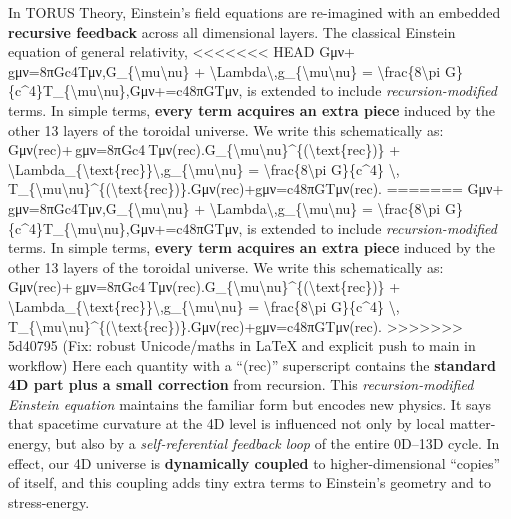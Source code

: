 \documentclass[]{article}
\begin{document}
In TORUS Theory, Einstein's field equations are re-imagined with an
embedded \textbf{recursive feedback} across all dimensional layers. The
classical Einstein equation of general relativity,
<<<<<<< HEAD
Gμν+\Lambda gμν=8πGc4Tμν,G\_\{\textbackslash mu\textbackslash nu\} +
\textbackslash Lambda\textbackslash,g\_\{\textbackslash mu\textbackslash nu\}
= \textbackslash frac\{8\textbackslash pi
G\}\{c\^{}4\}T\_\{\textbackslash mu\textbackslash nu\},Gμν\hspace{0pt}+\hspace{0pt}=c48πG\hspace{0pt}Tμν\hspace{0pt},
is extended to include \emph{recursion-modified} terms. In simple terms,
\textbf{every term acquires an extra piece} induced by the other 13
layers of the toroidal universe. We write this schematically as:
Gμν(rec)+\Lambdarec gμν=8πGc4 Tμν(rec).G\_\{\textbackslash mu\textbackslash nu\}\^{}\{(\textbackslash text\{rec\})\}
+
\textbackslash Lambda\_\{\textbackslash text\{rec\}\}\textbackslash,g\_\{\textbackslash mu\textbackslash nu\}
= \textbackslash frac\{8\textbackslash pi G\}\{c\^{}4\} \textbackslash,
T\_\{\textbackslash mu\textbackslash nu\}\^{}\{(\textbackslash text\{rec\})\}.Gμν(rec)\hspace{0pt}+\Lambdarec\hspace{0pt}gμν\hspace{0pt}=c48πG\hspace{0pt}Tμν(rec)\hspace{0pt}.
=======
Gμν+\Lambda gμν=8πGc4Tμν,G\_\{\textbackslash{}mu\textbackslash{}nu\} +
\textbackslash{}Lambda\textbackslash{},g\_\{\textbackslash{}mu\textbackslash{}nu\}
= \textbackslash{}frac\{8\textbackslash{}pi
G\}\{c\^{}4\}T\_\{\textbackslash{}mu\textbackslash{}nu\},Gμν​+​=c48πG​Tμν​,
is extended to include \emph{recursion-modified} terms. In simple terms,
\textbf{every term acquires an extra piece} induced by the other 13
layers of the toroidal universe. We write this schematically as:
Gμν(rec)+\Lambdarec gμν=8πGc4 Tμν(rec).G\_\{\textbackslash{}mu\textbackslash{}nu\}\^{}\{(\textbackslash{}text\{rec\})\}
+
\textbackslash{}Lambda\_\{\textbackslash{}text\{rec\}\}\textbackslash{},g\_\{\textbackslash{}mu\textbackslash{}nu\}
= \textbackslash{}frac\{8\textbackslash{}pi G\}\{c\^{}4\}
\textbackslash{},
T\_\{\textbackslash{}mu\textbackslash{}nu\}\^{}\{(\textbackslash{}text\{rec\})\}.Gμν(rec)​+\Lambdarec​gμν​=c48πG​Tμν(rec)​.
>>>>>>> 5d40795 (Fix: robust Unicode/maths in LaTeX and explicit push to main in workflow)
Here each quantity with a ``(rec)'' superscript contains the
\textbf{standard 4D part plus a small correction} from recursion. This
\emph{recursion-modified Einstein equation} maintains the familiar form
but encodes new physics. It says that spacetime curvature at the 4D
level is influenced not only by local matter-energy, but also by a
\emph{self-referential feedback loop} of the entire 0D--13D cycle​. In
effect, our 4D universe is \textbf{dynamically coupled} to
higher-dimensional ``copies'' of itself, and this coupling adds tiny
extra terms to Einstein's geometry and to stress-energy.
\end{document}
